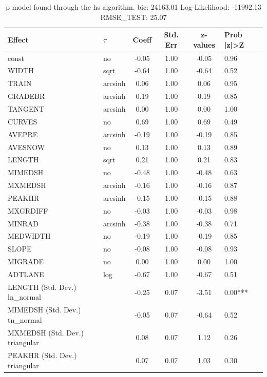 \begin{table}
	\caption{p model found through the hs algorithm. bic: 24163.01 Log-Likelihood: -11992.13 RMSE_TEST: 25.07}
	\begin{center}
		\begin{tabular}{|l|l|c|c|c|l|}
			\hline
			Effect & $\tau$ & Coeff & Std. Err & z-values & Prob |z|>Z \\
			\hline
			const & no & -0.05 & 1.00 & -0.05 & 0.96 \\
			\hline
			WIDTH & sqrt & -0.64 & 1.00 & -0.64 & 0.52 \\
			\hline
			TRAIN & arcsinh & 0.06 & 1.00 & 0.06 & 0.95 \\
			\hline
			GRADEBR & arcsinh & 0.19 & 1.00 & 0.19 & 0.85 \\
			\hline
			TANGENT & arcsinh & 0.00 & 1.00 & 0.00 & 1.00 \\
			\hline
			CURVES & no & 0.69 & 1.00 & 0.69 & 0.49 \\
			\hline
			AVEPRE & arcsinh & -0.19 & 1.00 & -0.19 & 0.85 \\
			\hline
			AVESNOW & no & 0.13 & 1.00 & 0.13 & 0.89 \\
			\hline
			LENGTH & sqrt & 0.21 & 1.00 & 0.21 & 0.83 \\
			\hline
			MIMEDSH & no & -0.48 & 1.00 & -0.48 & 0.63 \\
			\hline
			MXMEDSH & arcsinh & -0.16 & 1.00 & -0.16 & 0.87 \\
			\hline
			PEAKHR & arcsinh & -0.15 & 1.00 & -0.15 & 0.88 \\
			\hline
			MXGRDIFF & no & -0.03 & 1.00 & -0.03 & 0.98 \\
			\hline
			MINRAD & arcsinh & -0.38 & 1.00 & -0.38 & 0.71 \\
			\hline
			MEDWIDTH & no & -0.19 & 1.00 & -0.19 & 0.85 \\
			\hline
			SLOPE & no & -0.08 & 1.00 & -0.08 & 0.93 \\
			\hline
			MIGRADE & no & 0.00 & 1.00 & 0.00 & 1.00 \\
			\hline
			ADTLANE & log & -0.67 & 1.00 & -0.67 & 0.51 \\
			\hline
			LENGTH (Std. Dev.) ln_normal &  & -0.25 & 0.07 & -3.51 & 0.00*** \\
			\hline
			MIMEDSH (Std. Dev.) tn_normal &  & -0.05 & 0.07 & -0.64 & 0.52 \\
			\hline
			MXMEDSH (Std. Dev.) triangular &  & 0.08 & 0.07 & 1.12 & 0.26 \\
			\hline
			PEAKHR (Std. Dev.) triangular &  & 0.07 & 0.07 & 1.03 & 0.30 \\

\end{tabular}
\end{center}
\end{table}
